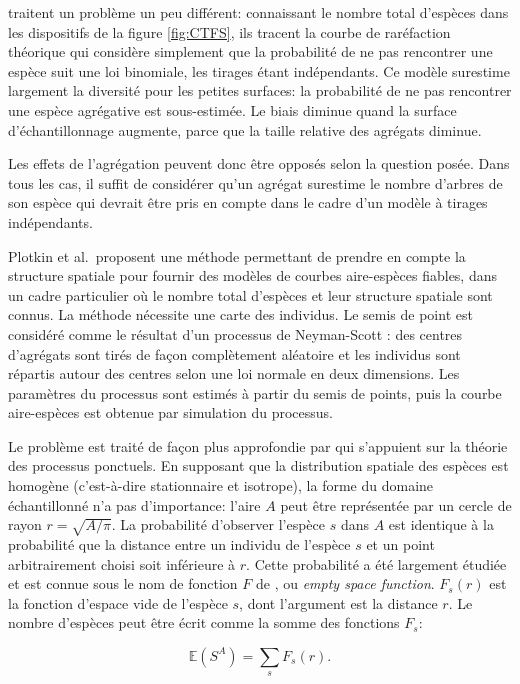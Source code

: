 \documentclass[
  11pt,
  french,
  a4paper,
  extrafontsizes,onecolumn,openright
  ]{memoir}
\newlength{\rf}
\begin{document}
\textcite{Plotkin2000a} traitent un problème un peu différent: connaissant le nombre total d'espèces dans les dispositifs de la figure \ref{fig:CTFS}, ils tracent la courbe de raréfaction théorique qui considère simplement que la probabilité de ne pas rencontrer une espèce suit une loi binomiale, les tirages étant indépendants.
Ce modèle surestime largement la diversité pour les petites surfaces: la probabilité de ne pas rencontrer une espèce agrégative est sous-estimée.
Le biais diminue quand la surface d'échantillonnage augmente, parce que la taille relative des agrégats diminue.

Les effets de l'agrégation peuvent donc être opposés selon la question posée.
Dans tous les cas, il suffit de considérer qu'un agrégat surestime le nombre d'arbres de son espèce qui devrait être pris en compte dans le cadre d'un modèle à tirages indépendants.

Plotkin et al.~proposent une méthode permettant de prendre en compte la structure spatiale pour fournir des modèles de courbes aire-espèces fiables, dans un cadre particulier où le nombre total d'espèces et leur structure spatiale sont connus.
La méthode nécessite une carte des individus.
Le semis de point est considéré comme le résultat d'un processus de Neyman-Scott \autocite{Neyman1958}: des centres d'agrégats sont tirés de façon complètement aléatoire et les individus sont répartis autour des centres selon une loi normale en deux dimensions.
Les paramètres du processus sont estimés à partir du semis de points, puis la courbe aire-espèces est obtenue par simulation du processus.

Le problème est traité de façon plus approfondie par \textcite{Picard2004} qui s'appuient sur la théorie des processus ponctuels.
En supposant que la distribution spatiale des espèces est homogène (c'est-à-dire stationnaire et isotrope), la forme du domaine échantillonné n'a pas d'importance: l'aire \(A\) peut être représentée par un cercle de rayon \(r=\sqrt{{A}/{\pi}}\).
La probabilité d'observer l'espèce \(s\) dans \(A\) est identique à la probabilité que la distance entre un individu de l'espèce \(s\) et un point arbitrairement choisi soit inférieure à \(r\).
Cette probabilité a été largement étudiée et est connue sous le nom de fonction \(F\) de \textcite{Diggle1983}, ou \emph{empty space function}.
\(F_s(r)\) est la fonction d'espace vide de l'espèce \(s\), dont l'argument est la distance \(r\).
Le nombre d'espèces peut être écrit comme la somme des fonctions \(F_s\):

\begin{equation}
  \label{eq:SARF}
  {\mathbb E}\left( S^A \right)  = \sum_s{F_s\left( r \right) }.
\end{equation}
\end{document}
